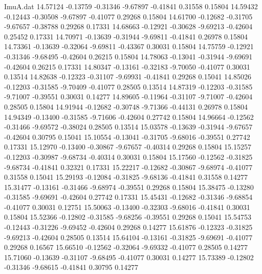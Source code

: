\begin{filecontents}{ImuA.dat}
  14.57124   -0.13759   -0.31346   -9.67897   -0.41841    0.31558    0.15804
  14.59432   -0.12443   -0.30508   -9.67897   -0.41077    0.29268    0.15804
  14.61700   -0.12682   -0.31705   -9.67657   -0.38788    0.29268    0.17331
  14.68663   -0.12921   -0.30628   -9.69213   -0.42604    0.25452    0.17331
  14.70971   -0.13639   -0.31944   -9.69811   -0.41841    0.26978    0.15804
  14.73361   -0.13639   -0.32064   -9.69811   -0.43367    0.30031    0.15804
  14.75759   -0.12921   -0.31346   -9.68495   -0.42604    0.26215    0.15804
  14.78063   -0.13041   -0.31944   -9.69691   -0.42604    0.26215    0.17331
  14.80347   -0.13161   -0.32183   -9.70050   -0.41077    0.30031    0.13514
  14.82638   -0.12323   -0.31107   -9.69931   -0.41841    0.29268    0.15041
  14.85026   -0.12203   -0.31585   -9.70409   -0.41077    0.28505    0.13514
  14.87319   -0.12203   -0.31585   -9.71007   -0.39551    0.30031    0.14277
  14.89605   -0.11964   -0.31107   -9.71007   -0.42604    0.28505    0.15804
  14.91944   -0.12682   -0.30748   -9.71366   -0.44131    0.26978    0.15804
  14.94349   -0.13400   -0.31585   -9.71606   -0.42604    0.27742    0.15804
  14.96664   -0.12562   -0.31466   -9.69572   -0.38024    0.28505    0.13514
  15.03578   -0.13639   -0.31944   -9.67657   -0.42604    0.30795    0.15041
  15.10554   -0.13041   -0.31705   -9.68016   -0.39551    0.27742    0.17331
  15.12970   -0.13400   -0.30867   -9.67657   -0.40314    0.29268    0.15804
  15.15257   -0.12203   -0.30987   -9.68734   -0.40314    0.30031    0.15804
  15.17560   -0.12562   -0.31825   -9.68734   -0.41841    0.32321    0.17331
  15.22217   -0.12682   -0.30867   -9.68974   -0.41077    0.31558    0.15041
  15.29193   -0.12084   -0.31825   -9.68136   -0.41841    0.31558    0.14277
  15.31477   -0.13161   -0.31466   -9.68974   -0.39551    0.29268    0.15804
  15.38475   -0.13280   -0.31585   -9.69691   -0.42604    0.27742    0.17331
  15.45431   -0.12682   -0.31346   -9.68854   -0.41077    0.30031    0.12751
  15.50063   -0.13400   -0.32303   -9.68016   -0.41841    0.30031    0.15804
  15.52366   -0.12802   -0.31585   -9.68256   -0.39551    0.29268    0.15041
  15.54753   -0.12443   -0.31226   -9.69452   -0.42604    0.29268    0.14277
  15.61876   -0.12323   -0.31825   -9.69213   -0.42604    0.28505    0.13514
  15.64104   -0.13161   -0.31825   -9.69691   -0.41077    0.29268    0.16567
  15.66510   -0.12562   -0.32064   -9.69332   -0.41077    0.28505    0.14277
  15.71060   -0.13639   -0.31107   -9.68495   -0.41077    0.30031    0.14277
  15.73389   -0.12802   -0.31346   -9.68615   -0.41841    0.30795    0.14277

\end{filecontents}
